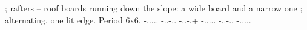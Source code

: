 ; rafters -- roof boards running down the slope: a wide board and a narrow one
; alternating, one lit edge. Period 6x6.
-.....
-..-..
-..-.+
-.....
-..-..
-.....
